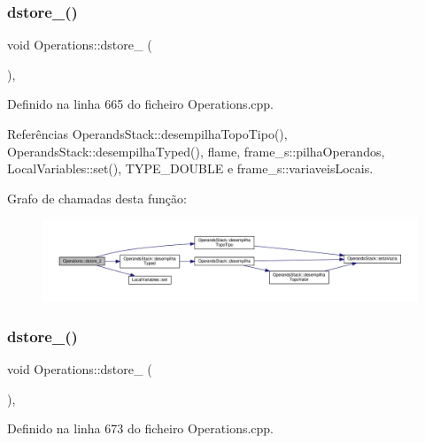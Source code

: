 \subsubsection{\texorpdfstring{dstore\+\_()}{dstore\_2()}}
{\footnotesize\ttfamily void Operations\+::dstore\+\_ (\begin{DoxyParamCaption}{ }\end{DoxyParamCaption})\hspace{0.3cm}{\ttfamily [static]}, {\ttfamily [private]}}



Definido na linha 665 do ficheiro Operations.\+cpp.



Referências Operands\+Stack\+::desempilha\+Topo\+Tipo(), Operands\+Stack\+::desempilha\+Typed(), flame, frame\+\_\+s\+::pilha\+Operandos, Local\+Variables\+::set(), T\+Y\+P\+E\+\_\+\+D\+O\+U\+B\+LE e frame\+\_\+s\+::variaveis\+Locais.

Grafo de chamadas desta função\+:
\nopagebreak
\begin{figure}[H]
\begin{center}
\leavevmode
\includegraphics[width=350pt]{classOperations_ad0f97963e6eb2482f5032fdb3465ec94_cgraph}
\end{center}
\end{figure}
\mbox{\label{classOperations_a161cba32105238617b0cfd5c47afdfe4}} 
\subsubsection{\texorpdfstring{dstore\+\_()}{dstore\_3()}}
{\footnotesize\ttfamily void Operations\+::dstore\+\_ (\begin{DoxyParamCaption}{ }\end{DoxyParamCaption})\hspace{0.3cm}{\ttfamily [static]}, {\ttfamily [private]}}



Definido na linha 673 do ficheiro Operations.\+cpp.



